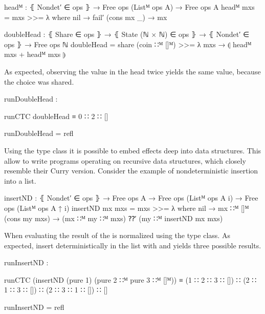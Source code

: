 \begin{code}
headᴹ : ⦃ Nondet′ ∈ ops ⦄ → Free ops (Listᴹ ops A) → Free ops A
headᴹ mxs = mxs >>= λ where
  nil         → fail′
  (cons mx _) → mx

doubleHead : ⦃ Share ∈ ops ⦄ → ⦃ State (ℕ × ℕ) ∈ ops ⦄ → ⦃ Nondet′ ∈ ops ⦄ →
  Free ops ℕ
doubleHead = share (coin ∷ᴹ []ᴹ) >>= λ mxs → ⦇ headᴹ mxs + headᴹ mxs ⦈
\end{code}
As expected, observing the value in the head twice yields the same value,
because the choice was shared.

\begin{center}
\begin{code}
runDoubleHead :
\end{code}
\begin{code}[inline]
 runCTC doubleHead ≡ 0 ∷ 2 ∷ []
\end{code}
\begin{code}
runDoubleHead = refl
\end{code}
\end{center}
Using the  type class it is possible to embed effects
deep into data structures.
This allow to write programs operating on recursive data structures, which
closely resemble their Curry version.
Consider the example of nondeterministic insertion into a list.

\begin{code}
insertND : ⦃ Nondet′ ∈ ops ⦄ →
  Free ops A → Free ops (Listᴹ ops A {i}) → Free ops (Listᴹ ops A {↑ i})
insertND mx mxs = mxs >>= λ where
  nil            → mx ∷ᴹ []ᴹ
  (cons my mxs)  → (mx ∷ᴹ my ∷ᴹ mxs) ⁇′ (my ∷ᴹ insertND mx mxs)
\end{code}
When evaluating the result of  the 
is normalized using the type class.
As expected, insert  deterministically in the list with
 and  yields three possible results.

\begin{center}
\begin{code}
runInsertND :
\end{code}
\begin{code}[inline]
 runCTC (insertND (pure 1) (pure 2 ∷ᴹ pure 3 ∷ᴹ []ᴹ)) ≡
   (1 ∷ 2 ∷ 3 ∷ []) ∷ (2 ∷ 1 ∷ 3 ∷ []) ∷ (2 ∷ 3 ∷ 1 ∷ []) ∷ []
\end{code}
\begin{code}
runInsertND = refl
\end{code}
\end{center}


